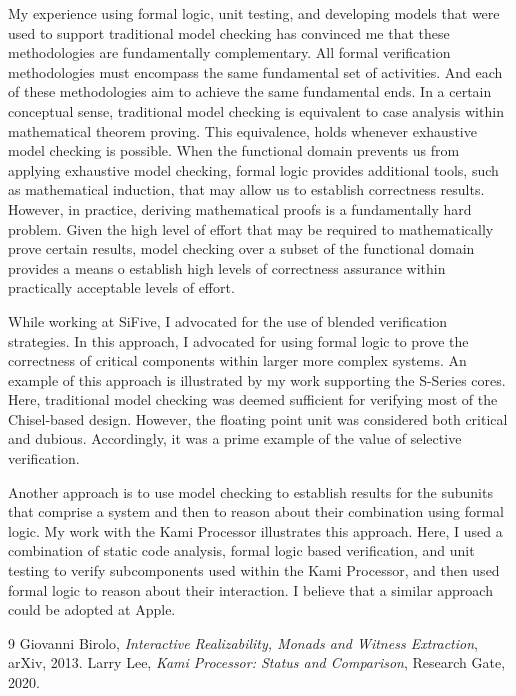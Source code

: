\documentclass[10pt,a4paper]{article}
\begin{document}
My experience using formal logic, unit testing, and developing models that were used to support traditional model checking has convinced me that these methodologies are fundamentally complementary. All formal verification methodologies must encompass the same fundamental set of activities. And each of these methodologies aim to achieve the same fundamental ends. In a certain conceptual sense, traditional model checking is equivalent to case analysis within mathematical theorem proving. This equivalence, holds whenever exhaustive model checking is possible. When the functional domain prevents us from applying exhaustive model checking, formal logic provides additional tools, such as mathematical induction, that may allow us to establish correctness results. However, in practice, deriving mathematical proofs is a fundamentally hard problem. Given the high level of effort that may be required to mathematically prove certain results, model checking over a subset of the functional domain provides a means o establish high levels of correctness assurance within practically acceptable levels of effort.

While working at SiFive, I advocated for the use of blended verification strategies. In this approach, I advocated for using formal logic to prove the correctness of critical components within larger more complex systems. An example of this approach is illustrated by my work supporting the S-Series cores. Here, traditional model checking was deemed sufficient for verifying most of the Chisel-based design. However, the floating point unit was considered both critical and dubious. Accordingly, it was a prime example of the value of selective verification.

Another approach is to use model checking to establish results for the subunits that comprise a system and then to reason about their combination using formal logic. My work with the Kami Processor illustrates this approach. Here, I used a combination of static code analysis, formal logic based verification, and unit testing to verify subcomponents used within the Kami Processor, and then used formal logic to reason about their interaction. I believe that a similar approach could be adopted at Apple.

\begin{thebibliography}{9}
  Giovanni Birolo,
  \textit{Interactive Realizability, Monads and Witness Extraction},
  arXiv,
  2013.
  Larry Lee,
  \textit{Kami Processor:  Status and Comparison},
  Research Gate,
  2020.  
\end{thebibliography}
\end{document}
